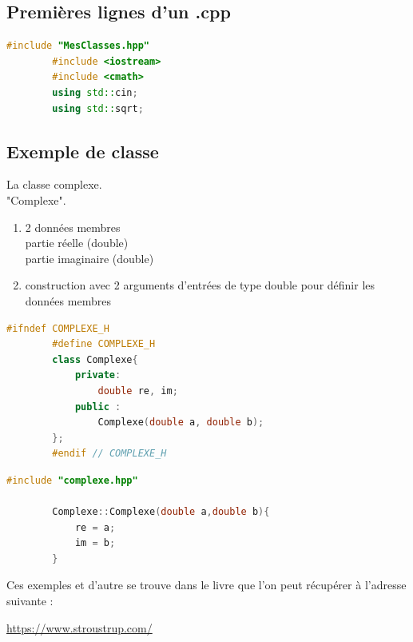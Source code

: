 \documentclass[12pt,a4paper]{article}
\begin{document}
	\newpage
	
	\subsection{Premières lignes d'un .cpp}
	
	\begin{lstlisting}[language=C++,caption=Début d'un .cpp]
		#include "MesClasses.hpp"
		#include <iostream>
		#include <cmath>
		using std::cin;
		using std::sqrt;
	\end{lstlisting}
	
	\subsection{Exemple de classe}
	
	La classe complexe.\\
	"Complexe".
	\begin{enumerate}[label=$\to$]
		\item 2 données membres\\
		partie réelle (double)\\
		partie imaginaire (double)
		
		\item construction avec 2 arguments d'entrées de type double pour définir les données membres
	\end{enumerate}
	
	\begin{lstlisting}[language=C++,caption=complexe.hpp]
		#ifndef COMPLEXE_H
		#define COMPLEXE_H
		class Complexe{
			private:
				double re, im;
			public :
				Complexe(double a, double b);
		};
		#endif // COMPLEXE_H
	\end{lstlisting}
	\begin{lstlisting}[language=C++,caption=complexe.cpp]
		#include "complexe.hpp"
		
		Complexe::Complexe(double a,double b){
			re = a;
			im = b;
		}
	\end{lstlisting}
	
	\noindent Ces exemples et d'autre se trouve dans le livre que l'on peut récupérer à l'adresse suivante :
	\begin{center}
		\url{https://www.stroustrup.com/}
	\end{center}
	
\end{document}
